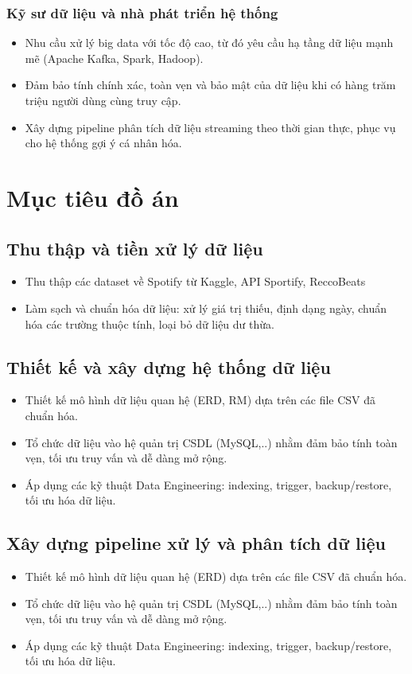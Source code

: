 \documentclass{latex/hcmut-report}
\begin{document}
\subsubsection{Kỹ sư dữ liệu và nhà phát triển hệ thống}
\begin{itemize}
    \item Nhu cầu xử lý big data với tốc độ cao, từ đó yêu cầu hạ tầng dữ liệu mạnh mẽ (Apache Kafka, Spark, Hadoop).

    \item Đảm bảo tính chính xác, toàn vẹn và bảo mật của dữ liệu khi có hàng trăm triệu người dùng cùng truy cập.

    \item Xây dựng pipeline phân tích dữ liệu streaming theo thời gian thực, phục vụ cho hệ thống gợi ý cá nhân hóa.
\end{itemize}

\section{Mục tiêu đồ án}

\subsection{Thu thập và tiền xử lý dữ liệu}
\begin{itemize}
    \item Thu thập các dataset về Spotify từ Kaggle, API Sportify, ReccoBeats
    \item Làm sạch và chuẩn hóa dữ liệu: xử lý giá trị thiếu, định dạng ngày, chuẩn hóa các trường thuộc tính, loại bỏ dữ liệu dư thừa.
\end{itemize}

\subsection{Thiết kế và xây dựng hệ thống dữ liệu}
\begin{itemize}
    \item Thiết kế mô hình dữ liệu quan hệ (ERD, RM) dựa trên các file CSV đã chuẩn hóa.
    \item Tổ chức dữ liệu vào hệ quản trị CSDL (MySQL,..) nhằm đảm bảo tính toàn vẹn, tối ưu truy vấn và dễ dàng mở rộng.
    \item Áp dụng các kỹ thuật Data Engineering: indexing, trigger, backup/restore, tối ưu hóa dữ liệu.
\end{itemize}

\subsection{Xây dựng pipeline xử lý và phân tích dữ liệu}
\begin{itemize}
    \item Thiết kế mô hình dữ liệu quan hệ (ERD) dựa trên các file CSV đã chuẩn hóa.
    \item Tổ chức dữ liệu vào hệ quản trị CSDL (MySQL,..) nhằm đảm bảo tính toàn vẹn, tối ưu truy vấn và dễ dàng mở rộng.
    \item Áp dụng các kỹ thuật Data Engineering: indexing, trigger, backup/restore, tối ưu hóa dữ liệu.
\end{itemize}
\end{document}
